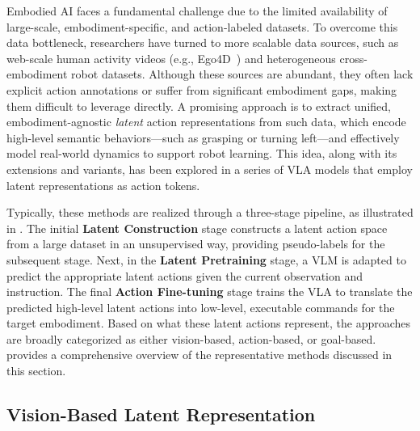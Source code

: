 \documentclass[10pt, a4paper, logo, copyright]{googledeepmind} %
\begin{document}
Embodied AI faces a fundamental challenge due to the limited availability of large-scale, embodiment-specific, and action-labeled datasets. To overcome this data bottleneck, researchers have turned to more scalable data sources, such as web-scale human activity videos (e.g., Ego4D~\cite{Ego4D2022CVPR}) and heterogeneous cross-embodiment robot datasets. Although these sources are abundant, they often lack explicit action annotations or suffer from significant embodiment gaps, making them difficult to leverage directly. A promising approach is to extract unified, embodiment-agnostic \emph{latent} action representations from such data, which encode high-level semantic behaviors---such as grasping or turning left---and effectively model real-world dynamics to support robot learning. This idea, along with its extensions and variants, has been explored in a series of VLA models that employ latent representations as action tokens.

Typically, these methods are realized through a three-stage pipeline, as illustrated in . 
The initial \textbf{Latent Construction} stage constructs a latent action space from a large dataset in an unsupervised way, providing pseudo-labels for the subsequent stage.
Next, in the \textbf{Latent Pretraining} stage, a VLM is adapted to predict the appropriate latent actions given the current observation and instruction. The final \textbf{Action Fine-tuning} stage trains the VLA to translate the predicted high-level latent actions into low-level, executable commands for the target embodiment.
Based on what these latent actions represent, the approaches are broadly categorized as either vision-based, action-based, or goal-based.
 provides a comprehensive overview of the representative methods discussed in this section.

\subsection{Vision-Based Latent Representation}
\end{document}
